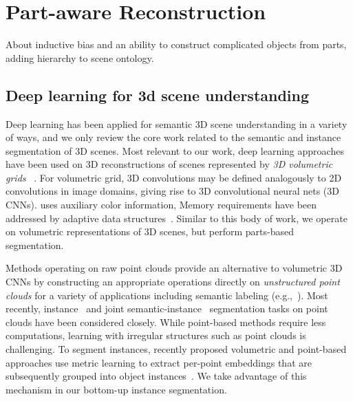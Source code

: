 \section{Part-aware Reconstruction}
\label{sec:part_reconstruction}

About inductive bias and an ability to construct complicated objects from parts, adding hierarchy to scene ontology.

\subsection{Deep learning for 3d scene understanding}
\label{related:scene-understanding}
Deep learning has been applied for semantic 3D scene understanding in a variety of ways, and we only review the core work related to the semantic and instance segmentation of 3D scenes. 
Most relevant to our work, deep learning approaches have been used on 3D reconstructions of scenes represented by \emph{3D volumetric grids} ~\cite{dai2017scannet,dai20183dmv,hou20193d,liu2019masc}. For volumetric grid, 3D convolutions may be defined analogously to 2D convolutions in image domains, giving rise to 3D convolutional neural nets (3D CNNs).
\cite{dai20183dmv} uses auxiliary color information, 
Memory requirements have been addressed by adaptive data structures~\cite{wang2017cnn}.
Similar to this body of work, we operate on volumetric representations of 3D scenes, but perform parts-based segmentation. %

Methods operating on raw point clouds provide an alternative to volumetric 3D CNNs by constructing an appropriate operations directly on \emph{unstructured point clouds} for a variety of applications including semantic labeling (e.g.,~\cite{qi2017pointnet,qi2017pointnet++,klokov2017escape,wang2018sgpn,wang2019dynamic}). Most recently, instance~\cite{elich20193d,liang20193d,elich20193d,yi2019gspn,yang2019learning,zhang2019point,engelmann20203d} and joint semantic-instance~\cite{wang2019associatively,pham2019jsis3d} segmentation tasks on point clouds have been considered closely. While point-based methods require less computations, learning with irregular structures such as point clouds is challenging.
To segment instances, recently proposed volumetric and point-based approaches use metric learning  to extract per-point embeddings that are subsequently grouped into object instances~\cite{elich20193d,yi2019gspn,lahoud20193d,liu2019masc}. We take advantage of this mechanism in our bottom-up instance segmentation.

